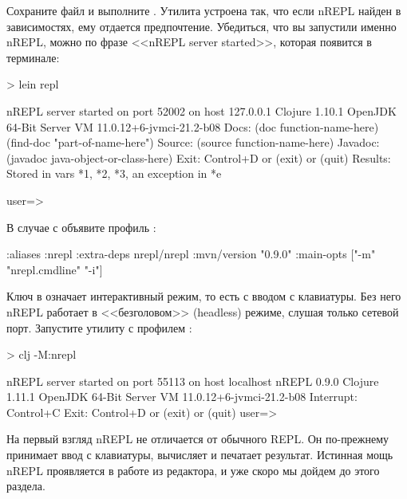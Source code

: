 Сохраните файл и выполните . Утилита  устроена так, что если nREPL найден в зависимостях, ему отдается предпочтение. Убедиться, что вы запустили именно nREPL, можно по фразе <<nREPL server started>>, которая появится в терминале:

\begin{english}
  \begin{text}
> lein repl

nREPL server started on port 52002 on host 127.0.0.1
Clojure 1.10.1
OpenJDK 64-Bit Server VM 11.0.12+6-jvmci-21.2-b08
    Docs: (doc function-name-here)
          (find-doc "part-of-name-here")
  Source: (source function-name-here)
 Javadoc: (javadoc java-object-or-class-here)
    Exit: Control+D or (exit) or (quit)
 Results: Stored in vars *1, *2, *3, an exception in *e

user=>
  \end{text}
\end{english}

В случае с  объявите профиль :

\begin{english}
  \begin{clojure/lines}
{:aliases
 {:nrepl
  {:extra-deps
   {nrepl/nrepl {:mvn/version "0.9.0"}}
   :main-opts ["-m" "nrepl.cmdline" "-i"]}}}
  \end{clojure/lines}
\end{english}

Ключ  в   означает интерактивный режим, то есть с вводом с клавиатуры. Без него nREPL работает в <<безголовом>> (headless) режиме, слушая только сетевой порт. Запустите утилиту  с профилем :

\begin{english}
  \begin{text}
> clj -M:nrepl

nREPL server started on port 55113 on host localhost
nREPL 0.9.0
Clojure 1.11.1
OpenJDK 64-Bit Server VM 11.0.12+6-jvmci-21.2-b08
Interrupt: Control+C
Exit:      Control+D or (exit) or (quit)
user=>
  \end{text}
\end{english}

На первый взгляд nREPL не отличается от обычного REPL. Он по-прежнему принимает ввод с клавиатуры, вычисляет и печатает результат. Истинная мощь nREPL проявляется в работе из редактора, и уже скоро мы дойдем до этого раздела.

